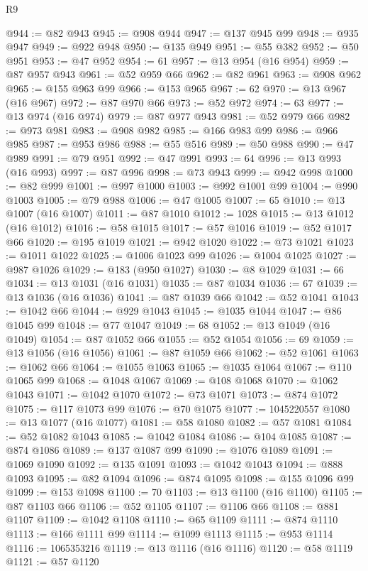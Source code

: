 \begin{lexlean}{R9}
\begin{coremodule}
@944 := @82 @943
@945 := @908 @944
@947 := @137 @945 @99
@948 := @935 @947
@949 := @922 @948
@950 := @135 @949
@951 := @55 @382
@952 := @50 @951
@953 := @47 @952
@954 := 61
@957 := @13 @954 (@16 @954)
@959 := @87 @957 @943
@961 := @52 @959 @66
@962 := @82 @961
@963 := @908 @962
@965 := @155 @963 @99
@966 := @153 @965
@967 := 62
@970 := @13 @967 (@16 @967)
@972 := @87 @970 @66
@973 := @52 @972
@974 := 63
@977 := @13 @974 (@16 @974)
@979 := @87 @977 @943
@981 := @52 @979 @66
@982 := @973 @981
@983 := @908 @982
@985 := @166 @983 @99
@986 := @966 @985
@987 := @953 @986
@988 := @55 @516
@989 := @50 @988
@990 := @47 @989
@991 := @79 @951
@992 := @47 @991
@993 := 64
@996 := @13 @993 (@16 @993)
@997 := @87 @996
@998 := @73 @943
@999 := @942 @998
@1000 := @82 @999
@1001 := @997 @1000
@1003 := @992 @1001 @99
@1004 := @990 @1003
@1005 := @79 @988
@1006 := @47 @1005
@1007 := 65
@1010 := @13 @1007 (@16 @1007)
@1011 := @87 @1010
@1012 := 1028
@1015 := @13 @1012 (@16 @1012)
@1016 := @58 @1015
@1017 := @57 @1016
@1019 := @52 @1017 @66
@1020 := @195 @1019
@1021 := @942 @1020
@1022 := @73 @1021
@1023 := @1011 @1022
@1025 := @1006 @1023 @99
@1026 := @1004 @1025
@1027 := @987 @1026
@1029 := @183 (@950 @1027)
@1030 := @8 @1029
@1031 := 66
@1034 := @13 @1031 (@16 @1031)
@1035 := @87 @1034
@1036 := 67
@1039 := @13 @1036 (@16 @1036)
@1041 := @87 @1039 @66
@1042 := @52 @1041
@1043 := @1042 @66
@1044 := @929 @1043
@1045 := @1035 @1044
@1047 := @86 @1045 @99
@1048 := @77 @1047
@1049 := 68
@1052 := @13 @1049 (@16 @1049)
@1054 := @87 @1052 @66
@1055 := @52 @1054
@1056 := 69
@1059 := @13 @1056 (@16 @1056)
@1061 := @87 @1059 @66
@1062 := @52 @1061
@1063 := @1062 @66
@1064 := @1055 @1063
@1065 := @1035 @1064
@1067 := @110 @1065 @99
@1068 := @1048 @1067
@1069 := @108 @1068
@1070 := @1062 @1043
@1071 := @1042 @1070
@1072 := @73 @1071
@1073 := @874 @1072
@1075 := @117 @1073 @99
@1076 := @70 @1075
@1077 := 1045220557
@1080 := @13 @1077 (@16 @1077)
@1081 := @58 @1080
@1082 := @57 @1081
@1084 := @52 @1082 @1043
@1085 := @1042 @1084
@1086 := @104 @1085
@1087 := @874 @1086
@1089 := @137 @1087 @99
@1090 := @1076 @1089
@1091 := @1069 @1090
@1092 := @135 @1091
@1093 := @1042 @1043
@1094 := @888 @1093
@1095 := @82 @1094
@1096 := @874 @1095
@1098 := @155 @1096 @99
@1099 := @153 @1098
@1100 := 70
@1103 := @13 @1100 (@16 @1100)
@1105 := @87 @1103 @66
@1106 := @52 @1105
@1107 := @1106 @66
@1108 := @881 @1107
@1109 := @1042 @1108
@1110 := @65 @1109
@1111 := @874 @1110
@1113 := @166 @1111 @99
@1114 := @1099 @1113
@1115 := @953 @1114
@1116 := 1065353216
@1119 := @13 @1116 (@16 @1116)
@1120 := @58 @1119
@1121 := @57 @1120

\end{coremodule}
\end{lexlean}

